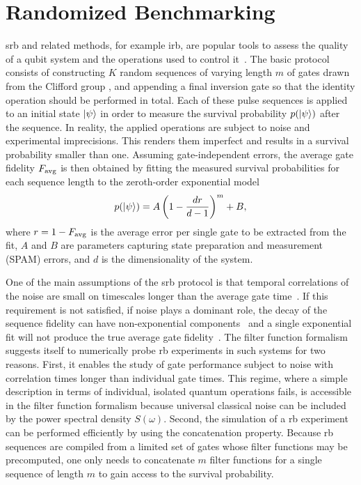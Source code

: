 \section{Randomized Benchmarking}\label{sec:ff:examples:randomized_benchmarking}
\Gls{srb} and related methods, for example \gls{irb}, are popular tools to assess the quality of a qubit system and the operations used to control it~\cite{Knill2008,Magesan2011,Magesan2012}.
The basic protocol consists of constructing $K$ random sequences of varying length $m$ of gates drawn from the Clifford group
,
and appending a final inversion gate so that the identity operation should be performed in total.
Each of these pulse sequences is applied to an initial state $\mbox{\ensuremath{\ket{\psi}}}$ in order to measure the survival probability $p(\mbox{\ensuremath{\ket{\psi}}})$ after the sequence.
In reality, the applied operations are subject to noise and experimental imprecisions.
This renders them imperfect and results in a survival probability smaller than one.
Assuming gate-independent errors, the average gate fidelity $F_{\mathrm{avg}}$ is then obtained by fitting the measured survival probabilities for each sequence length to the zeroth-order exponential model~\cite{Magesan2011}
\begin{equation}\label{eq:ff:SRB}
    p(\mbox{\ensuremath{\ket{\psi}}}) = A \left(1 - \frac{dr}{d-1}\right)^m + B,
\end{equation}
where $r = 1 - F_{\mathrm{avg}}$ is the average error per single gate to be extracted from the fit, $A$ and $B$ are parameters capturing state preparation and measurement (SPAM) errors, and $d$ is the dimensionality of the system.

One of the main assumptions of the \gls{srb} protocol is that temporal correlations of the noise are small on timescales longer than the average gate time~\cite{Magesan2011}.
If this requirement is not satisfied, \eg if \oneoverf noise plays a dominant role, the decay of the sequence fidelity can have non-exponential components~\cite{Epstein2014,Fogarty2015,Feng2016} and a single exponential fit will not produce the true average gate fidelity~\cite{Mavadia2018,Edmunds2020}.
The filter function formalism suggests itself to numerically probe \gls{rb} experiments in such systems for two reasons.
First, it enables the study of gate performance subject to noise with correlation times longer than individual gate times.
This regime, where a simple description in terms of individual, isolated quantum operations fails, is accessible in the filter function formalism because universal classical noise can be included by the power spectral density $S(\omega)$.
Second, the simulation of a \gls{rb} experiment can be performed efficiently by using the concatenation property.
Because \gls{rb} sequences are compiled from a limited set of gates whose filter functions may be precomputed, one only needs to concatenate $m$ filter functions for a single sequence of length $m$ to gain access to the survival probability.

